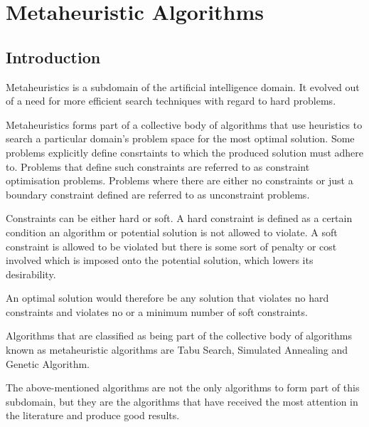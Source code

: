 \chapter{Metaheuristic Algorithms}
\label{chpt:heuristic}
\section{Introduction}
Metaheuristics is a subdomain of the artificial intelligence domain\cite{AIModernApproach}. It evolved out of a need for more efficient search techniques with regard to hard problems. 

Metaheuristics forms part of a collective body of algorithms that use heuristics to search a particular domain's problem space for the most optimal solution\cite{AIModernApproach,NatureInspiredMetaHeuristic}. Some problems explicitly define consrtaints to which the produced solution must adhere to. Problems that define such constraints are referred to as constraint optimisation problems\cite{FundamentalSwarm}. Problems where there are either no constraints or just a boundary constraint  defined are referred to as unconstraint problems\cite{FundamentalSwarm}.

Constraints can be either hard or soft. A hard constraint is defined as a certain condition an algorithm or potential solution is not allowed to violate\cite{AIModernApproach,NatureInspiredMetaHeuristic,Karen2004,Eisenblatter}. A soft constraint is allowed to be violated but there is some sort of penalty or cost involved which is imposed onto the potential solution, which lowers its desirability\cite{AIModernApproach,NatureInspiredMetaHeuristic,Karen2004,Eisenblatter}. 

An optimal solution would therefore be any solution that violates no hard constraints and violates no or a minimum number of soft constraints\cite{AIModernApproach,NatureInspiredMetaHeuristic,Karen2004,Eisenblatter}.

Algorithms that are classified as being part of the collective body of algorithms known as metaheuristic algorithms are Tabu Search\cite{TabuVechicleRoutingWithTimeWindows,TabuCSP}, Simulated Annealing \cite{SASingleMultiObj,CurveFittingSA} and Genetic Algorithm\cite{GATSP, GeostatisticalGA}.

The above-mentioned algorithms are not the only algorithms to form part of this subdomain, but they are the algorithms that have received the most attention in the literature and produce good results\cite{SweepMeta}.

